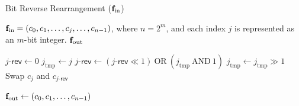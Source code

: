 \begin{algorithm}[h]
	\caption{\textsf{Bit Reverse Rearrangement} (${\bf{f}}_\text{in}$)}
	\label{Algo:Bit Reversal}
	\begin{algorithmic}[1]
		\Require ${\bf{f}}_\text{in} = (c_0, c_1, \ldots, c_j, \ldots, c_{n-1})$, where $n = 2^m$, and each index $j$ is represented as an $m$-bit integer.
		\Ensure ${\bf{f}}_\text{out}$
		
		\State $j\text{-}\mathsf{rev} \gets 0$
		\State $j_{\text{tmp}} \gets j$
		\State $j\text{-}\mathsf{rev} \gets (j\text{-}\mathsf{rev} \ll 1) \ \text{OR} \ (j_{\text{tmp}} \ \text{AND} \ 1)$
		\State $j_{\text{tmp}} \gets j_{\text{tmp}} \gg 1$
		\EndFor
		\State Swap $c_j$ and $c_{j\text{-}\mathsf{rev}}$
		\EndIf
		\EndFor
		
		\State \Return ${\bf{f}}_\text{out} \gets (c_0, c_1, \ldots, c_{n-1})$
	\end{algorithmic}
\end{algorithm}






